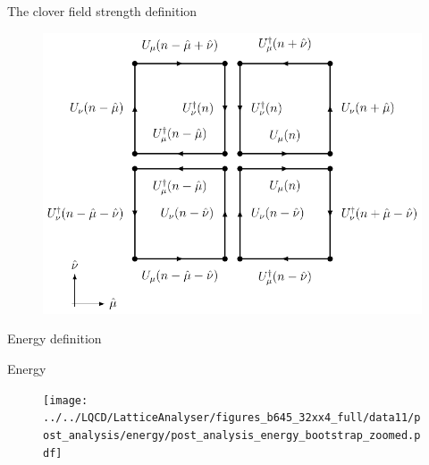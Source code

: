 \documentclass[10pt,show notes on second screen]{beamer}
\begin{document}
\begin{frame}{The clover field strength definition}
\begin{figure}
    \centering
    \includegraphics[scale=0.7]{../figures/illustrations/lqcd/clover/clover}
\end{figure}
\end{frame}

\begin{frame}{Energy definition}
\end{frame}

\begin{frame}{Energy}
\vspace{-10.0pt}
\begin{figure}
    \centering
    \texttt{[image: ../../LQCD/LatticeAnalyser/figures\_b645\_32xx4\_full/data11/post\_analysis/energy/post\_analysis\_energy\_bootstrap\_zoomed.pdf]}
\end{figure}
\end{frame}
\end{document}
